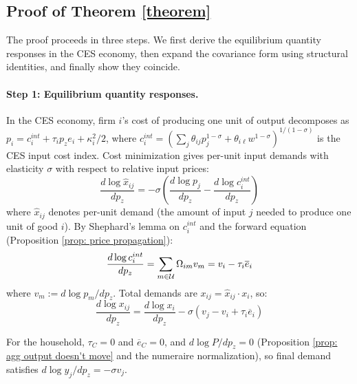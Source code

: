 \subsection{Proof of Theorem \ref{theorem}}

The proof proceeds in three steps. We first derive the equilibrium quantity responses in the CES economy, then expand the covariance form using structural identities, and finally show they coincide.

\paragraph{Step 1: Equilibrium quantity responses.}
In the CES economy, firm $i$'s cost of producing one unit of output decomposes as $p_i = c_i^{int} + \tau_i p_z e_i + \kappa_i^2/2$, where $c_i^{int} = (\sum_j \theta_{ij}p_j^{1-\sigma} + \theta_{i\ell}w^{1-\sigma})^{1/(1-\sigma)}$ is the CES input cost index. Cost minimization gives per-unit input demands with elasticity $\sigma$ with respect to relative input prices:
\begin{equation}
    \label{eq: per unit demand}
    \frac{d \log \hat{x}_{ij}}{dp_z} = -\sigma\left(\frac{d \log p_j}{dp_z} - \frac{d \log c_i^{int}}{dp_z}\right)
\end{equation}
where $\hat{x}_{ij}$ denotes per-unit demand (the amount of input $j$ needed to produce one unit of good $i$). By Shephard's lemma on $c_i^{int}$ and the forward equation (Proposition \ref{prop: price propagation}):
$$\frac{d \log c_i^{int}}{dp_z} = \sum_{m \in \mathcal{U}} \Omega_{im} v_m = v_i - \tau_i \overline{e}_i$$
where $v_m := d\log p_m / dp_z$. Total demands are $x_{ij} = \hat{x}_{ij} \cdot x_i$, so:
\begin{equation}
    \label{eq: total demand ces}
    \frac{d \log x_{ij}}{dp_z} = \frac{d \log x_i}{dp_z} - \sigma(v_j - v_i + \tau_i\overline{e}_i)
\end{equation}

For the household, $\tau_C = 0$ and $\overline{e}_C = 0$, and $d\log P/dp_z = 0$ (Proposition \ref{prop: agg output doesn't move} and the numeraire normalization), so final demand satisfies $d \log y_j / dp_z = -\sigma v_j$.

